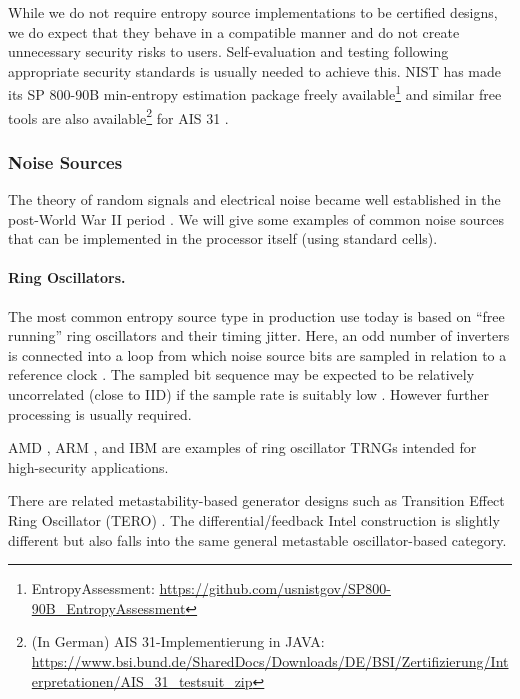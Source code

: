     While we do not require entropy source implementations to be
    certified designs, we do expect that they behave in a compatible manner
    and do not create unnecessary security risks to users. Self-evaluation
    and testing following appropriate security standards is usually needed
    to achieve this. NIST has made its SP 800-90B\cite{TuBaKe+18} min-entropy
    estimation package freely available\footnote{EntropyAssessment:
    \url{https://github.com/usnistgov/SP800-90B_EntropyAssessment}} and
    similar free tools are also available\footnote{(In German)
    AIS 31-Implementierung in JAVA:
    \url{https://www.bsi.bund.de/SharedDocs/Downloads/DE/BSI/Zertifizierung/Interpretationen/AIS_31_testsuit_zip}}
    for AIS 31 \cite{KiSc11}.

\subsubsection{Noise Sources}
\label{sec:noise-sources}

    The theory of random signals and electrical noise became well
    established in the post-World War II period \cite{Ri44,Ri45,DaRo58}.
    We will give some examples of common noise sources that can be
    implemented in the processor itself (using standard cells).

    \paragraph{Ring Oscillators.}
    The most common entropy source type in production use today is
    based on ``free running'' ring oscillators and their timing jitter.
    Here, an odd number of inverters is connected into a loop from which
    noise source bits are sampled in relation to a reference clock
    \cite{BaLuMi+11}. The sampled bit sequence may be expected to be
    relatively uncorrelated (close to IID) if the sample rate is suitably low
    \cite{KiSc11}. However further processing is usually required.

    AMD \cite{AM17}, ARM \cite{AR17}, and IBM \cite{LiBaBo+13} are
    examples of ring oscillator TRNGs intended for high-security
    applications.

    There are related metastability-based generator designs such as
    Transition Effect Ring Oscillator (TERO) \cite{VaDr10}.
    The differential/feedback Intel construction \cite{HaKoMa12} is slightly
    different but also falls into the same general metastable
    oscillator-based category.

